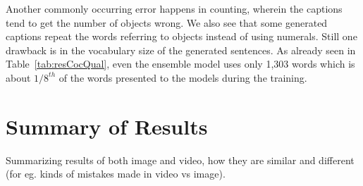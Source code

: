 Another commonly occurring error happens in counting, wherein the
captions tend to get the number of objects wrong.
We also see that some generated captions repeat the words referring to
objects instead of using numerals.
Still one drawback is in the vocabulary size of the generated
sentences.
As already seen in Table~\ref{tab:resCocQual}, even the ensemble
model uses only 1,303 words which is about $1/8^{th}$ of the words
presented to the models during the training.

\section{Summary of Results}
Summarizing results of both image and video, how they are similar and different
(for eg. kinds of mistakes made in video vs image).
